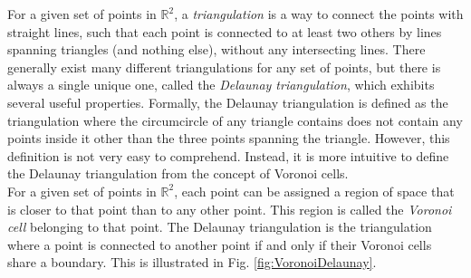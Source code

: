 \documentclass{article}
\begin{document}
For a given set of points in $\mathbb{R}^{2}$, a \emph{triangulation} is a way to connect the points with straight lines, such that each point is connected to at least two others by lines spanning triangles (and nothing else), without any intersecting lines. There generally exist many different triangulations for any set of points, but there is always a single unique one, called the \emph{Delaunay triangulation}, which exhibits several useful properties. Formally, the Delaunay triangulation is defined as the triangulation where the circumcircle of any triangle contains does not contain any points inside it other than the three points spanning the triangle. However, this definition is not very easy to comprehend. Instead, it is more intuitive to define the Delaunay triangulation from the concept of Voronoi cells.\\
For a given set of points in $\mathbb{R}^{2}$, each point can be assigned a region of space that is closer to that point than to any other point. This region is called the \emph{Voronoi cell} belonging to that point. The Delaunay triangulation is the triangulation where a point is connected to another point if and only if their Voronoi cells share a boundary. This is illustrated in Fig. \ref{fig:VoronoiDelaunay}.
\end{document}
